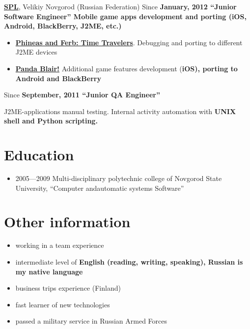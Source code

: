 {
\vspace{15pt}
\fontsize{12pt}{12pt}\selectfont
\href{http://spl.co}{\bfseries SPL\mdseries},
Velikiy Novgorod (Russian Federation)
}
\subitem Since \bfseries January, 2012 \mdseries ``Junior Software Engineer''
\subitem Mobile game apps development and porting
(iOS, Android, BlackBerry, J2ME, etc.)
\begin{itemize}
\setlength{\itemindent}{20pt}
\item
    \href{http://java.mob.org/game/phineas\_and\_ferb\_time\_travelers.html}
        {\bfseries Phineas and Ferb: Time Travelers\mdseries}.
        Debugging and porting to different J2ME devices
\item
    \href{https://itunes.apple.com/us/app/panda-blair!/id500995558?mt=8}
        {\bfseries Panda Blair!\mdseries}
        Additional game features development (\bfseries iOS\mdseries),
        porting to \bfseries Android \mdseries and \bfseries BlackBerry\mdseries
\end{itemize}

\vspace{5pt}
\subitem Since \bfseries September, 2011 \mdseries ``Junior QA Engineer''

\subitem J2ME-applications manual testing. Internal activity automation with
\bfseries UNIX shell \mdseries and \bfseries Python \mdseries scripting.

\section{Education}
\begin{itemize}
\item 2005---2009 Multi-disciplinary polytechnic college of
Novgorod State University,
``Computer and\linebreak automatic systems Software''
\end{itemize}

\section{Other information}
\begin{itemize}
\item working in a team experience
\item intermediate level of \bfseries English \mdseries (reading, writing, speaking),
Russian is my native language
\item business trips experience (Finland)
\item fast learner of new technologies
\item passed a military service in Russian Armed Forces
\end{itemize}

